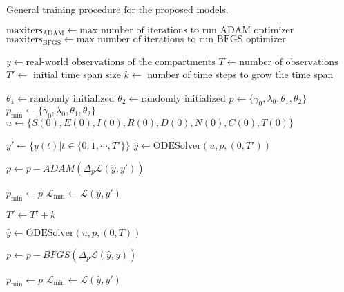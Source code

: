 \begin{algorithm}
    \caption[Model training procedure]{General training procedure for the proposed models.}
    \label{alg:seir-ude-training}
    \begin{algorithmic}
        \State $\text{maxiters}_\text{ADAM} \gets \text{max number of iterations to run ADAM optimizer}$
        \State $\text{maxiters}_\text{BFGS} \gets \text{max number of iterations to run BFGS optimizer}$

        \State $y \gets \text{real-world observations of the compartments}$
        \State $T \gets \text{number of observations}$
        \State $T' \gets$ initial time span size
        \State $k \gets$ number of time steps to grow the time span

        \State $\theta_1 \gets \text{randomly initialized}$
        \State $\theta_2 \gets \text{randomly initialized}$
        \State $p \gets \{ \gamma_0, \lambda_0, \theta_1, \theta_2 \}$
        \State $p_\text{min} \gets \{ \gamma_0, \lambda_0, \theta_1, \theta_2 \}$
        \State $u \gets \{ S(0), E(0), I(0), R(0), D(0), N(0), C(0), T(0) \}$

            \State $y' \gets \{ y(t) | t \in \{ 0,1,\cdots,T' \} \}$
                \State $\hat{y} \gets \text{ODESolver}(u, p, (0, T'))$

                \State $p \gets p - ADAM(\Delta_p \mathcal{L}(\hat{y}, y'))$

                    \State $p_\text{min} \gets p$
                    \State $\mathcal{L}_\text{min} \gets \mathcal{L}(\hat{y}, y')$
                \EndIf
            \EndFor

            \State $T' \gets T' + k$
        \EndWhile

            \State $\hat{y} \gets \text{ODESolver}(u, p, (0, T))$

            \State $p \gets p - BFGS(\Delta_p \mathcal{L}(\hat{y}, y))$

                \State $p_\text{min} \gets p$
                \State $\mathcal{L}_\text{min} \gets \mathcal{L}(\hat{y}, y')$
            \EndIf
        \EndFor
    \end{algorithmic}
\end{algorithm}